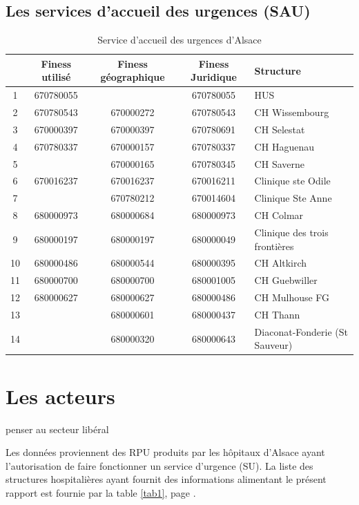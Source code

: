 \documentclass[12pt,english,french]{report}\usepackage{graphicx, color}
\begin{document}
\section{Les services d'accueil des urgences (SAU)}

\begin{table}
\begin{center}
\begin{tabular}{|c|c|c|c|l|}
  \hline
& Finess utilisé & Finess géographique & Finess Juridique & Structure \\
  \hline
  \hline
1 & 670780055 &   & 670780055 & HUS \\
2 & 670780543 & 670000272 & 670780543 & CH Wissembourg \\
3 & 670000397 & 670000397  & 670780691 & CH Selestat \\
4 & 670780337 & 670000157 & 670780337 & CH Haguenau \\
5 &   & 670000165 & 670780345 & CH Saverne \\
6 & 670016237  & 670016237  & 670016211 & Clinique ste Odile \\
7 &   & 670780212 & 670014604 & Clinique Ste Anne \\
8 & 680000973 & 680000684 & 680000973 & CH Colmar \\
9 & 680000197  & 680000197  & 680000049 & Clinique des trois frontières \\
10 & 680000486 & 680000544  & 680000395 & CH Altkirch \\
11 & 680000700 & 680000700 & 680001005 & CH Guebwiller \\
12 & 680000627 & 680000627 & 680000486 & CH Mulhouse FG \\
13 &   & 680000601 & 680000437 & CH Thann \\
14 &   & 680000320  & 680000643 & Diaconat-Fonderie (St Sauveur) \\
\hline
\end{tabular}
\caption{Service d'accueil des urgences d'Alsace}
\label{summary}
\end{center}
\end{table}

\chapter{Les acteurs}


penser au secteur libéral



Les données proviennent des RPU produits par les hôpitaux d'Alsace ayant l'autorisation de faire fonctionner un service d'urgence (SU). La liste des structures hospitalières ayant fournit des informations alimentant le présent rapport est fournie par la table \ref{tab1}, page \pageref{tab1}.
\end{document}

